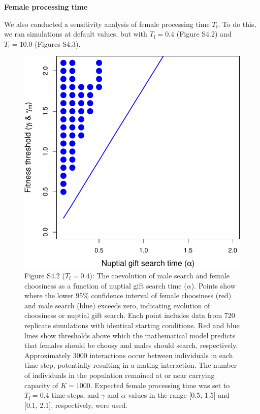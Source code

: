 \documentclass[
]{article}
\begin{document}
\captionsetup{labelformat=default}

\textbf{Female processing time}

We also conducted a sensitivity analysis of female processing time
\(T_{\mathrm{f}}\). To do this, we ran simulations at default values,
but with \(T_{\mathrm{f}} = 0.4\) (Figure S4.2) and
\(T_{\mathrm{f}} = 10.0\) (Figures S4.3).

\captionsetup{labelformat=empty}

\begin{figure}
\centering
\includegraphics{ms_refs_fixed_files/figure-latex/unnamed-chunk-7-1.pdf}
\caption{Figure S4.2 (\(T_{\mathrm{f}} = 0.4\)): The coevolution of male
search and female choosiness as a function of nuptial gift search time
(\(\alpha\)). Points show where the lower 95\% confidence interval of
female choosiness (red) and male search (blue) exceeds zero, indicating
evolution of choosiness or nuptial gift search. Each point includes data
from 720 replicate simulations with identical starting conditions. Red
and blue lines show thresholds above which the mathematical model
predicts that females should be choosy and males should search,
respectively. Approximately 3000 interactions occur between individuals
in each time step, potentially resulting in a mating interaction. The
number of individuals in the population remained at or near carrying
capacity of \(K = 1000\). Expected female processing time was set to
\(T_{\mathrm{f}}=0.4\) time steps, and \(\gamma\) and \(\alpha\) values
in the range {[}0.5, 1.5{]} and {[}0.1, 2.1{]}, respectively, were
used.}
\end{figure}
\end{document}
